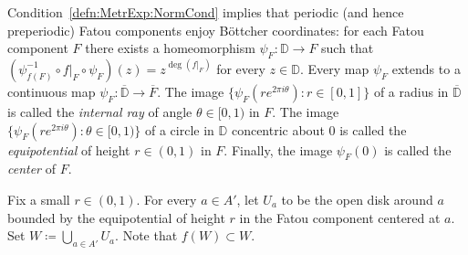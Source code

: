 \documentclass{amsart}
\theoremstyle{plain}
\theoremstyle{definition}
\theoremstyle{remark}
\newcommand{\disk}{{\mathbb D}}
\renewcommand{\sp}{{\ \ }}
\newcommand\lift[2]{{\uparrow}_{#1}^{#2}}
\begin{document}
Condition~\eqref{defn:MetrExp:NormCond} implies that periodic (and hence preperiodic) Fatou components enjoy B\"ottcher coordinates: for each Fatou component $F$ there exists a homeomorphism $\psi_F\colon \disk \to F$ such that $(\psi^{-1}_{f(F)}\circ f|_F \circ \psi_F)(z)= z^{\deg(f|_F)}$ for every $z\in \disk$. Every map $\psi_F$ extends to a continuous map $\psi_F\colon \overline \disk \to \overline{F}$. The image $\{\psi_F(re^{2\pi i\theta})\colon r\in [0,1]\}$ of a radius in $\overline{\disk}$ is called the \emph{internal ray} of angle $\theta\in[0,1)$ in $F$. The image $\{\psi_F(re^{2\pi i\theta})\colon \theta\in [0,1)\}$ of a circle in $\disk$ concentric about $0$ is called the \emph{equipotential} of height $r\in (0,1)$ in $F$. Finally, the image $\psi_F(0)$ is called the \emph{center} of $F$.






Fix a small $r\in (0,1)$. For every $a\in A'$, let $U_a$ to be the open disk around $a$ bounded by the equipotential of height $r$ in the Fatou component centered at $a$. Set $W\coloneq \bigcup _{a\in A'} U_a$. Note that $f(W)\subset W$.



\end{document}
